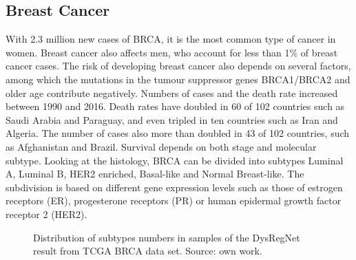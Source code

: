 \documentclass[pdftex,12pt,a4paper]{report}
\begin{document}
\subsection{Breast Cancer}
\label{breast cancer}
With 2.3 million new cases of BRCA, it is the most common type of cancer in women\cite{brca_general}. Breast cancer also affects men, who account for less than 1\% of breast cancer cases. The risk of developing breast cancer also depends on several factors, among which the mutations in the tumour suppressor genes BRCA1/BRCA2 and older age contribute negatively. Numbers of cases and the death rate increased between 1990 and 2016. Death rates have doubled in 60 of 102 countries such as Saudi Arabia and Paraguay, and even tripled in ten countries such as Iran and Algeria. The number of cases also more than doubled in 43 of 102 countries, such as Afghanistan and Brazil\cite{brca_history}. Survival depends on both stage and molecular subtype. Looking at the histology, BRCA can be divided into subtypes Luminal A, Luminal B, HER2 enriched, Basal-like and Normal Breast-like. The subdivision is based on different gene expression levels such as those of estrogen receptors (ER), progesterone receptors (PR) or human epidermal growth factor receptor 2 (HER2).
\begin{figure}[!ht]
\begin{center}
	\caption{Distribution of subtypes numbers in samples of the DysRegNet result from TCGA\cite{tcga} BRCA data set. Source: own work.}
	\label{subtypes}
\end{center}
\end{figure}
\end{document}
